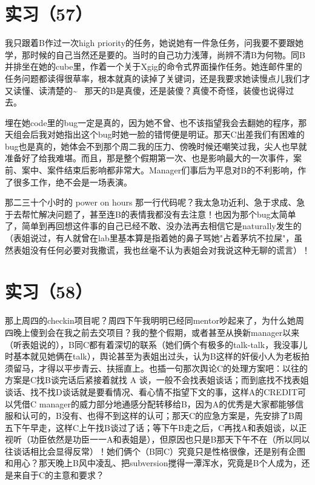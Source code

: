 \documentclass[12pt]{book}
\begin{document}
\section{实习（57）}
\label{sec-5-60}

我只跟着B作过一次high priority的任务，她说她有一件急任务，问我要不要跟她学，那时候的自己当然还是要的。当时的自己功力浅薄，尚辨不清B为何物。同B并排坐在她的cube里，作着一个关于Xgig的命令式界面操作任务。她连邮件里的任务问题都读得很草率，根本就真的读掉了关键词，还是我要求她读慢点儿我们才又读懂、读清楚的\textasciitilde{}~ 那天的B是真傻，还是装傻？真傻不奇怪，装傻也说得过去。

埋在她code里的bug一定是真的，因为她不曾、也不该指望我会去翻她的程序，那天组会后我对她指出这个bug时她一脸的错愕便是明证。那天C出差我们有困难的bug也是真的，她体会不到那个周二我的压力、傍晚时候还嘲笑过我，尖人也早就准备好了给我难堪。而且，那是整个假期第一次、也是影响最大的一次事件，案前、案中、案件结束后影响都非常大。Manager们事后为平息对B的不利影响，作了很多工作，绝不会是一场表演。

那二三十个小时的 power on hours 那一行代码呢？我太急功近利、急于求成、急于去帮忙解决问题了，甚至连B的表情我都没有去注意！也因为那个bug太简单了，简单到再回想这件事的自己已经不敢、没办法再去相信它是naturally发生的（表姐说过，有人就曾在lab里基本算是指着她的鼻子骂她"占着茅坑不拉屎"，虽然表姐没有任何必要对我撒谎，我也丝毫不认为表姐会对我说这种无聊的谎言）！


\section{实习（58）}
\label{sec-5-61}

那上周四的checkin项目呢？周四下午我明明已经同mentor吵起来了，为什么她周四晚上傻到会在我之前去交项目？我的整个假期，或者甚至从换新manager以来（听表姐说的），B同C都有着深切的联系（她们俩个有极多的talk-talk，我没事儿时基本就见她俩在talk），舆论甚至为表姐出过头，认为B这样的奸佞小人为老板拍须留马，才得以平步青云、扶摇直上。也插一句那次舆论C的处理方案吧：以往的方案是C找B谈完话后紧接着就找 A 谈，一般不会找表姐谈话；而到底找不找表姐谈话、找不找D谈话就是要看情况、看心情不指望下文的事，这样A的CREDIT可以凭借C manager的威力部分地通感分配转移给B，因为A的优秀是大家都能够信服和认可的，B没有、也得不到这样的认可；那天C的应急方案是，先安排了B周五下午早走，这样C上午找B谈过了话；等下午B走之后，C再找A和表姐谈，以正视听（功臣依然是功臣一一A和表姐是），但原因也只是B那天下午不在（所以同以往谈话相比会显得反常）！她们俩个（B同C）究竟只是性格很像，还是别有企图和用心？那天晚上B风中凌乱、把subversion搅得一潭浑水，究竟是B个人成为，还是来自于C的主意和要求？
\end{document}
